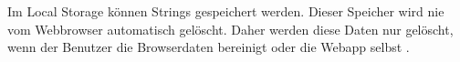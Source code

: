 \label{sec:localstorage}

Im Local Storage können Strings gespeichert werden. Dieser Speicher wird nie vom Webbrowser automatisch gelöscht. Daher werden diese Daten nur gelöscht, wenn der Benutzer die Browserdaten bereinigt oder die Webapp selbst . 
\cite{w3LocalStorage}


